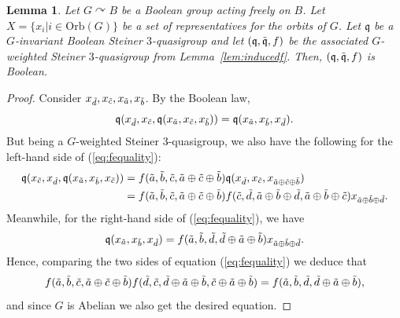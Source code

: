 \documentclass{article}
\newtheorem{lemma}[theorem]{Lemma}
\theoremstyle{remark}
\theoremstyle{definition}
\def\acts{\curvearrowright}
\begin{document}
\begin{lemma}\label{lem:equationfcond} Let $G\acts B$ be a Boolean group acting freely on $B$. Let $X=\{ x_i \vert i\in \mathrm{Orb}(G)\}$ be a set of representatives for the orbits of $G$. Let $\mathfrak{q}$ be a $G$-invariant Boolean Steiner $3$-quasigroup and let $(\mathfrak{q}, \Tilde{\mathfrak{q}}, f)$ be the associated $G$-weighted Steiner $3$-quasigroup from Lemma~\ref{lem:inducedf}. Then, $(\mathfrak{q}, \Tilde{\mathfrak{q}}, f)$ is Boolean.
\end{lemma}

\begin{proof} Consider $x_{\Tilde{d}}, x_{\Tilde{c}}, x_{\Tilde{a}}, x_{\Tilde{b}}$. By the Boolean law, 
\begin{equation}\label{eq:fequality}
    \mathfrak{q}(x_{\Tilde{d}}, x_{\Tilde{c}}, \mathfrak{q}(x_{\Tilde{a}}, x_{\Tilde{c}},x_{\Tilde{b}}))=\mathfrak{q}(x_{\Tilde{a}}, x_{\Tilde{b}}, x_{\Tilde{d}}).
\end{equation}
But being a $G$-weighted Steiner $3$-quasigroup, we also have the following for the left-hand side of (\ref{eq:fequality}):
\begin{align*}
    \mathfrak{q}(x_{\Tilde{c}}, x_{\Tilde{d}}, \mathfrak{q}(x_{\Tilde{a}}, x_{\Tilde{b}}, x_{\Tilde{c}}))&= f(\Tilde{a}, \Tilde{b}, \Tilde{c}, \Tilde{a}\oplus\Tilde{c}\oplus\Tilde{b})\mathfrak{q}(x_{\Tilde{d}}, x_{\Tilde{c}}, x_{\Tilde{a}\oplus\Tilde{c}\oplus\Tilde{b}})\\
    &=f(\Tilde{a}, \Tilde{b}, \Tilde{c}, \Tilde{a}\oplus\Tilde{c}\oplus\Tilde{b})f(\Tilde{c}, \Tilde{d}, \Tilde{a}\oplus\Tilde{b}\oplus\Tilde{d}, \Tilde{a}\oplus\Tilde{b}\oplus\Tilde{c}) x_{\Tilde{a}\oplus\Tilde{b}\oplus\Tilde{d}}.
\end{align*}
Meanwhile, for the right-hand side of (\ref{eq:fequality}), we have
\[\mathfrak{q}( x_{\Tilde{a}}, x_{\Tilde{b}}, x_{\Tilde{d}})=f({\Tilde{a}}, {\Tilde{b}}, {\Tilde{d}},\Tilde{d}\oplus\Tilde{a}\oplus\Tilde{b}) x_{\Tilde{a}\oplus\Tilde{b}\oplus\Tilde{d}}.\]
Hence, comparing the two sides of equation (\ref{eq:fequality}) we deduce that
\[f(\Tilde{a}, \Tilde{b}, \Tilde{c}, \Tilde{a}\oplus\Tilde{c}\oplus\Tilde{b})f(\Tilde{d}, \Tilde{c}, \Tilde{d}\oplus\Tilde{a}\oplus\Tilde{b}, \Tilde{c}\oplus\Tilde{a}\oplus\Tilde{b}) = f({\Tilde{a}}, {\Tilde{b}}, {\Tilde{d}}, \Tilde{d}\oplus\Tilde{a}\oplus\Tilde{b}), \]
and since $G$ is Abelian we also get the desired equation.
\end{proof}
\end{document}
